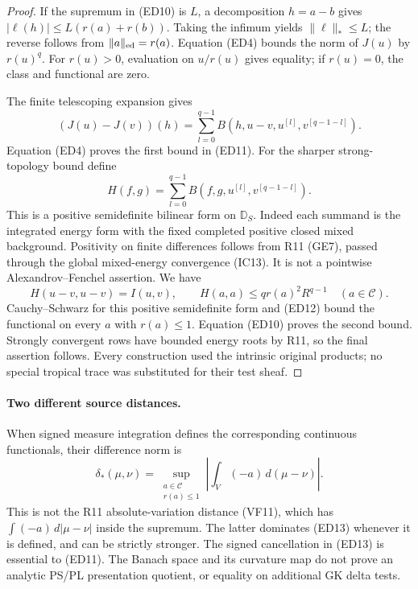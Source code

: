 \documentclass[11pt,a4paper]{article}
\numberwithin{equation}{section}
\theoremstyle{definition}
\theoremstyle{remark}
\begin{document}
\begin{proof}
If the supremum in (ED10) is $L$, a decomposition $h=a-b$
gives $|\ell(h)|\leq L(r(a)+r(b))$. Taking the infimum yields
$\|\ell\|_*\leq L$; the reverse follows from
$\|a\|_{\rm ed}=r(a)$. Equation (ED4) bounds the norm of
$J(u)$ by $r(u)^q$. For $r(u)>0$, evaluation on $u/r(u)$
gives equality; if $r(u)=0$, the class and functional are zero.

The finite telescoping expansion gives
\[
 (J(u)-J(v))(h)
    =\sum_{l=0}^{q-1}B(h,u-v,u^{[l]},v^{[q-1-l]}).
 \tag{ED12}
\]
Equation (ED4) proves the first bound in (ED11).
For the sharper strong-topology bound define
\[
 H(f,g)=\sum_{l=0}^{q-1}
                 B(f,g,u^{[l]},v^{[q-1-l]}).
\]
This is a positive semidefinite bilinear form on $\mathbb D_S$.
Indeed each summand is the integrated energy form with the
fixed completed positive closed mixed background. Positivity on
finite differences follows from R11 (GE7), passed through the
global mixed-energy convergence (IC13). It is not a pointwise
Alexandrov--Fenchel assertion. We have
\[
 H(u-v,u-v)=I(u,v),\qquad
 H(a,a)\leq q r(a)^2R^{q-1}\quad(a\in\mathscr C).
\]
Cauchy--Schwarz for this positive semidefinite form and (ED12)
bound the functional on every $a$ with $r(a)\leq1$.
Equation (ED10) proves the second bound. Strongly convergent
rows have bounded energy roots by R11, so the final assertion
follows. Every construction used the intrinsic original products;
no special tropical trace was substituted for their test sheaf.
\end{proof}

\paragraph{Two different source distances.}
When signed measure integration defines the corresponding continuous
functionals, their difference norm is
\[
 \delta_*(\mu,\nu)
     =\sup_{\substack{a\in\mathscr C\\r(a)\leq1}}
                    \left|\int_V(-a)\,d(\mu-\nu)\right|.
 \tag{ED13}
\]
This is not the R11 absolute-variation distance (VF11), which has
$\int(-a)\,d|\mu-\nu|$ inside the supremum. The latter dominates
(ED13) whenever it is defined, and can be strictly stronger.
The signed cancellation in (ED13) is essential to (ED11).
The Banach space and its curvature map do not prove an analytic
PS/PL presentation quotient, or equality on additional GK delta tests.

\end{document}
